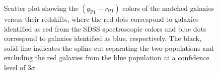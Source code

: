\documentclass[iop, apjl, twocolappendix, numberedappendix]{emulateapj}
\begin{document}
\begin{figure}
\caption{Scatter plot showing the $(g_{\mathrm{P1}}-r_{\mathrm{P1}})$ colors
of the matched galaxies versus their redshifts, where the red dots correspond
to galaxies identified as red from the SDSS spectroscopic colors and blue dots
correspond to galaxies identified as blue, respectively. The black, solid line
indicates the spline cut separating the two populations and excluding the red
galaxies from the blue population at a confidence level of $3 \sigma$.}
   \label{fig:g-r_vs_z}
\end{figure}


\label{lastpage}
\end{document}
